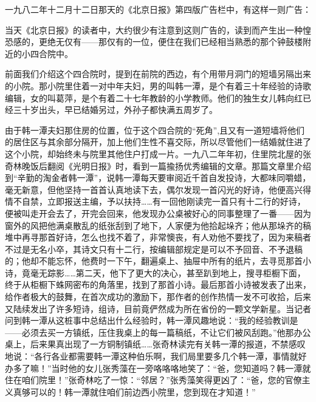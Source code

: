 \par 一九八二年十二月十二日那天的《北京日报》第四版广告栏中，有这样一则广告：
\par 当天《北京日报》的读者中，大约很少有注意到这则广告的，读到而产生出一种惶恐感的，更绝无仅有——那仅有的一位，便住在我们已经相当熟悉的那个钟鼓楼附近的小四合院中。
\par 前面我们介绍这个四合院时，提到在前院的西边，有个用带月洞门的短墙另隔出来的小院。那小院里住着一对中年夫妇，男的叫韩一潭，是个有着三十年经验的诗歌编辑，女的叫葛萍，是个有着二十七年教龄的小学教师。他们的独生女儿韩向红已经三十岁出头，早已结婚另过，外孙子都快满五周岁了。
\par 由于韩一潭夫妇那住房的位置，位于这个四合院的“死角”,且又有一道短墙将他们的居住区与其余部分隔开，加上他们生性不喜交际，所以尽管他们一结婚就住进了这个小院，却始终未与院里其他住户打成一片。一九八二年年初，住里院北屋的张奇林晚饭后翻阅《光明日报》时，看到一篇揄扬优秀编辑的文章。那篇文章里介绍到“辛勤的淘金者韩一潭”，说韩一潭每天要审阅近千首自发投诗，大都味同嚼蜡，毫无新意，但他坚持一首首认真地读下去，偶尔发现一首闪光的好诗，他便高兴得情不自禁，立即报送主编，予以扶持……有一回他刚读完一首只有十二行的好诗，便被叫走开会去了，开完会回来，他发现办公桌被好心的同事整理了一番——因为窗外的风把他满桌散乱的纸张刮到了地下，人家便为他拾起垛齐；他从那垛齐的稿堆中再寻那首好诗，怎么也找不着了，非常懊丧，有人劝他不要找了，因为来稿者不过是无名小卒，其诗文只有十二行，按编辑部规定是可以不予回音、不予退稿的；他却不能忘怀，他费时一下午，翻遍桌上、抽屉中所有的纸片，去寻觅那首小诗，竟毫无踪影……第二天，他下了更大的决心，甚至趴到地上，搜寻柜橱下面，终于从柜橱下蛛网密布的角落里，找到了那首小诗。最后那首小诗被发表了出来，给作者极大的鼓舞，在首次成功的激励下，那作者的创作热情一发不可收拾，后来又陆续发出了许多短诗，组诗，目前竟俨然成为所在省份的一颗文学新星。当记者问到韩一潭从这桩事中总结出什么经验时，韩一潭风趣地说：“我的经验教训是——必须去买一方镇纸，压住我桌上的每一篇稿纸，不让它们被风刮跑。”他那办公桌上，后来果真出现了一方铜制镇纸……张奇林读完有关韩一潭的报道，不禁感叹地说：“各行各业都需要韩一潭这种伯乐啊，我们局里要多几个韩一潭，事情就好办多了嘛！”当时他的女儿张秀藻在一旁咯咯咯地笑了：“爸，您知道吗？韩一潭就住在咱们院里！”张奇林吃了一惊：“邻居？”张秀藻笑得更凶了：“爸，您的官僚主义真够可以的！韩一潭就住咱们前边西小院里，您到现在才知道！”
